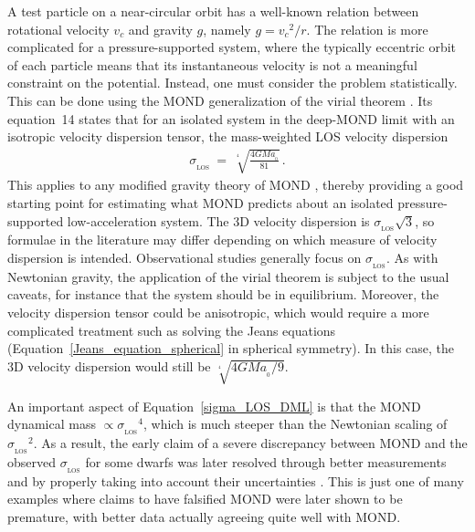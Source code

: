\documentclass[fleqn,usenatbib,useAMS,onecolumn]{mnras} %
\begin{document}
A test particle on a near-circular orbit has a well-known relation between rotational velocity $v_c$ and gravity $g$, namely $g = {v_c}^2/r$. The relation is more complicated for a pressure-supported system, where the typically eccentric orbit of each particle means that its instantaneous velocity is not a meaningful constraint on the potential. Instead, one must consider the problem statistically. This can be done using the MOND generalization of the virial theorem \citep{Milgrom_1994_virial}. Its equation~14 states that for an isolated system in the deep-MOND limit with an isotropic velocity dispersion tensor, the mass-weighted LOS velocity dispersion
\begin{eqnarray}
	\sigma_{_\text{LOS}} ~=~ \sqrt[^4]{\frac{4GMa_{_0}}{81}} \, .
	\label{sigma_LOS_DML}
\end{eqnarray}
This applies to any modified gravity theory of MOND \citep{Milgrom_2014}, thereby providing a good starting point for estimating what MOND predicts about an isolated pressure-supported low-acceleration system. The 3D velocity dispersion is $\sigma_{_\text{LOS}} \sqrt{3}$, so formulae in the literature may differ depending on which measure of velocity dispersion is intended. Observational studies generally focus on $\sigma_{_\text{LOS}}$. As with Newtonian gravity, the application of the virial theorem is subject to the usual caveats, for instance that the system should be in equilibrium. Moreover, the velocity dispersion tensor could be anisotropic, which would require a more complicated treatment such as solving the Jeans equations (Equation~\ref{Jeans_equation_spherical} in spherical symmetry). In this case, the 3D velocity dispersion would still be $\sqrt[^4]{4GMa_{_0}/9}$.

An important aspect of Equation~\ref{sigma_LOS_DML} is that the MOND dynamical mass $\propto {\sigma_{_\text{LOS}}}^4$, which is much steeper than the Newtonian scaling of ${\sigma_{_\text{LOS}}}^2$. As a result, the early claim of a severe discrepancy between MOND and the observed $\sigma_{_\text{LOS}}$ for some dwarfs \citep{Gerhard_1992} was later resolved through better measurements and by properly taking into account their uncertainties \citep{Milgrom_1995}. This is just one of many examples where claims to have falsified MOND were later shown to be premature, with better data actually agreeing quite well with MOND.
\end{document}
